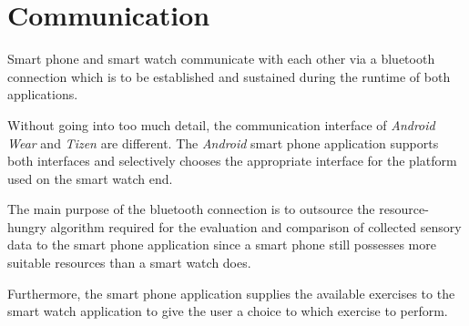 \section{Communication}

Smart phone and smart watch communicate with each other via a bluetooth
connection which is to be established and sustained during the runtime of both
applications.

Without going into too much detail, the communication interface
of \textit{Android Wear} and \textit{Tizen} are different. The \textit{Android}
smart phone application supports both interfaces and selectively chooses the
appropriate interface for the platform used on the smart watch end.

The main purpose of the bluetooth connection is to outsource the
resource-hungry algorithm required for the evaluation and comparison of
collected sensory data to the smart phone application since a smart phone still
possesses more suitable resources than a smart watch does.

Furthermore, the smart phone application supplies the available exercises to
the smart watch application to give the user a choice to which exercise to
perform.
